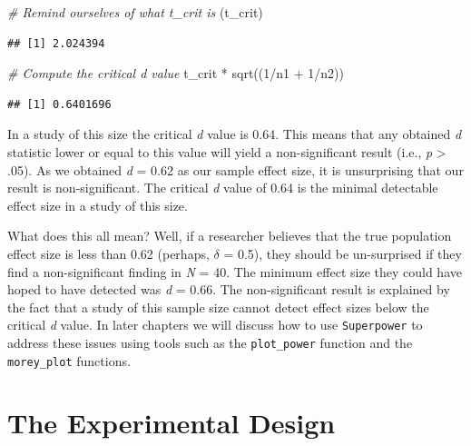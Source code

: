 \documentclass[
]{book}
\newenvironment{Shaded}{\begin{snugshade}}{\end{snugshade}}
\newcommand{\CommentTok}[1]{\textcolor[rgb]{0.56,0.35,0.01}{\textit{#1}}}
\newcommand{\DecValTok}[1]{\textcolor[rgb]{0.00,0.00,0.81}{#1}}
\newcommand{\FunctionTok}[1]{\textcolor[rgb]{0.00,0.00,0.00}{#1}}
\newcommand{\NormalTok}[1]{#1}
\newcommand{\SpecialCharTok}[1]{\textcolor[rgb]{0.00,0.00,0.00}{#1}}
\begin{document}
\begin{Shaded}
\begin{Highlighting}[]
\CommentTok{\# Remind ourselves of what t\_crit is}
\NormalTok{(t\_crit)}
\end{Highlighting}
\end{Shaded}

\begin{verbatim}
## [1] 2.024394
\end{verbatim}

\begin{Shaded}
\begin{Highlighting}[]
\CommentTok{\# Compute the critical d value}
\NormalTok{t\_crit }\SpecialCharTok{*} \FunctionTok{sqrt}\NormalTok{((}\DecValTok{1}\SpecialCharTok{/}\NormalTok{n1 }\SpecialCharTok{+} \DecValTok{1}\SpecialCharTok{/}\NormalTok{n2))}
\end{Highlighting}
\end{Shaded}

\begin{verbatim}
## [1] 0.6401696
\end{verbatim}

In a study of this size the critical \emph{d} value is 0.64. This means that any obtained \emph{d} statistic lower or equal to this value will yield a non-significant result (i.e., \emph{p} \textgreater{} .05). As we obtained \emph{d} = 0.62 as our sample effect size, it is unsurprising that our result is non-significant. The critical \emph{d} value of 0.64 is the minimal detectable effect size in a study of this size.

What does this all mean? Well, if a researcher believes that the true population effect size is less than 0.62 (perhaps, \(\delta\) = 0.5), they should be un-surprised if they find a non-significant finding in \emph{N} = 40. The minimum effect size they could have hoped to have detected was \emph{d} = 0.66. The non-significant result is explained by the fact that a study of this sample size cannot detect effect sizes below the critical \emph{d} value. In later chapters we will discuss how to use \texttt{Superpower} to address these issues using tools such as the \texttt{plot\_power} function and the \texttt{morey\_plot} functions.

\hypertarget{the-experimental-design}{%
\chapter{The Experimental Design}\label{the-experimental-design}}
\end{document}
